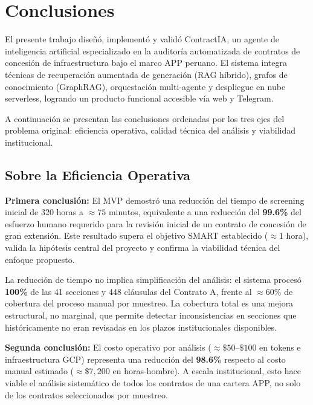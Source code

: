 \chapter{Conclusiones}

El presente trabajo diseñó, implementó y validó ContractIA, un agente de
inteligencia artificial especializado en la auditoría automatizada de contratos
de concesión de infraestructura bajo el marco APP peruano. El sistema integra
técnicas de recuperación aumentada de generación (RAG híbrido), grafos de
conocimiento (GraphRAG), orquestación multi-agente y despliegue en nube
serverless, logrando un producto funcional accesible vía web y Telegram.

A continuación se presentan las conclusiones ordenadas por los tres ejes
del problema original: eficiencia operativa, calidad técnica del análisis
y viabilidad institucional.

\section*{Sobre la Eficiencia Operativa}

\textbf{Primera conclusión:}
El MVP demostró una reducción del tiempo de screening inicial de 320 horas
a $\approx 75$ minutos, equivalente a una reducción del \textbf{99.6\%} del
esfuerzo humano requerido para la revisión inicial de un contrato de
concesión de gran extensión. Este resultado supera el objetivo SMART
establecido ($\approx 1$ hora), valida la hipótesis central del proyecto
y confirma la viabilidad técnica del enfoque propuesto.

La reducción de tiempo no implica simplificación del análisis: el sistema
procesó \textbf{100\%} de las 41 secciones y 448 cláusulas del Contrato A, frente al $\approx 60\%$ de cobertura del proceso manual por muestreo. La cobertura total es una mejora estructural, no marginal, que permite detectar inconsistencias en secciones que históricamente no
eran revisadas en los plazos institucionales disponibles.

\textbf{Segunda conclusión:}
El costo operativo por análisis ($\approx \$50$--$\$100$ en tokens e infraestructura GCP) representa una reducción del \textbf{98.6\%} respecto al costo manual estimado ($\approx \$7{,}200$ en horas-hombre). A escala institucional, esto hace viable el análisis sistemático de todos los contratos de una cartera APP, no solo de los contratos seleccionados por muestreo.

